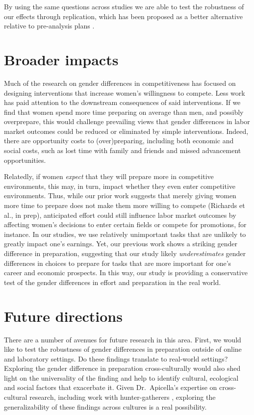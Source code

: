 \documentclass[a4paper, nobind]{templates/ociamthesis}
\begin{document}
By using the same questions across studies we are able to test the robustness of our effects through replication, which has been proposed as a better alternative relative to pre-analysis plans \autocite{Coffman2015}.

\hypertarget{broader-impacts}{%
\chapter{Broader impacts}\label{broader-impacts}}

Much of the research on gender differences in competitiveness has focused on designing interventions that increase women's willingness to compete. Less work has paid attention to the downstream consequences of said interventions. If we find that women spend more time preparing on average than men, and possibly overprepare, this would challenge prevailing views that gender differences in labor market outcomes could be reduced or eliminated by simple interventions. Indeed, there are opportunity costs to (over)preparing, including both economic and social costs, such as lost time with family and friends and missed advancement opportunities.

Relatedly, if women \emph{expect} that they will prepare more in competitive environments, this may, in turn, impact whether they even enter competitive environments. Thus, while our prior work suggests that merely giving women more time to prepare does not make them more willing to compete (Richards et al., in prep), anticipated effort could still influence labor market outcomes by affecting women's decisions to enter certain fields or compete for promotions, for instance. In our studies, we use relatively unimportant tasks that are unlikely to greatly impact one's earnings. Yet, our previous work shows a striking gender difference in preparation, suggesting that our study likely \emph{underestimates} gender differences in choices to prepare for tasks that are more important for one's career and economic prospects. In this way, our study is providing a conservative test of the gender differences in effort and preparation in the real world.

\hypertarget{future-directions}{%
\chapter{Future directions}\label{future-directions}}

There are a number of avenues for future research in this area. First, we would like to test the robustness of gender differences in preparation outside of online and laboratory settings. Do these findings translate to real-world settings? Exploring the gender difference in preparation cross-culturally would also shed light on the universality of the finding and help to identify cultural, ecological and social factors that exacerbate it. Given Dr.~Apicella's expertise on cross-cultural research, including work with hunter-gatherers \autocite{Apicella2014a,Apicella2012,Apicella2017,Apicella2015,Apicella2009,Apicella2015a,Apicella2018,Apicella2007,Apicella2014,Apicella2016,Apicella2018a,Apicella2007a}, exploring the generalizability of these findings across cultures is a real possibility.
\end{document}
